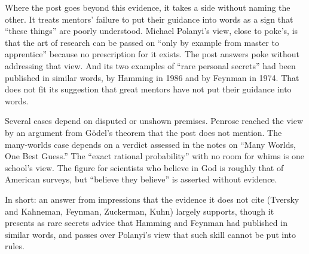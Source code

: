 \begin{afterword}
Where the post goes beyond this evidence, it takes a side without naming the other. It treats mentors' failure to put their guidance into words as a sign that ``these things'' are poorly understood. Michael Polanyi's view, close to poke's, is that the art of research can be passed on ``only by example from master to apprentice'' because no prescription for it exists. The post answers poke without addressing that view. And its two examples of ``rare personal secrets'' had been published in similar words, by Hamming in 1986 and by Feynman in 1974. That does not fit its suggestion that great mentors have not put their guidance into words.

Several cases depend on disputed or unshown premises. Penrose reached the view by an argument from Gödel's theorem that the post does not mention. The many-worlds case depends on a verdict assessed in the notes on ``Many Worlds, One Best Guess.'' The ``exact rational probability'' with no room for whims is one school's view. The figure for scientists who believe in God is roughly that of American surveys, but ``believe they believe'' is asserted without evidence.

In short: an answer from impressions that the evidence it does not cite (Tversky and Kahneman, Feynman, Zuckerman, Kuhn) largely supports, though it presents as rare secrets advice that Hamming and Feynman had published in similar words, and passes over Polanyi's view that such skill cannot be put into rules.
\end{afterword}
